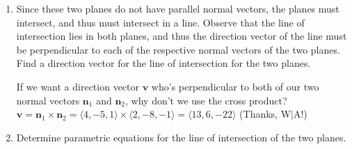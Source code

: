 \documentclass[10pt]{article}
\newcommand{\vv}{\mathbf{v}}
\newcommand{\vn}{\mathbf{n}}
\newenvironment{red}{\color{red}}{\ignorespacesafterend}
\begin{document}
\begin{enumerate}[leftmargin=0pt]
\begin{enumerate}
	\begin{red}
		Let's solve both scalar equations for $z$, and then equate the two $z$'s. 
		\begin{align*}
			\textrm{Plane 1: } 4x - 5y + z &= -2 \\
			z &= -2 -4x + 5y \\
			\textrm{Plane 2: } 2x - 8y - z &= -7 \\
			z &= 2x - 8y + 7 \\
			-2 - 4x + 5y &= 2x - 8y + 7 \\
			6x -13y &= -9
			\intertext{Now we get to pick some value we want for one of these variables. How about $x=0$?}
			-13y &= -9 \\
			y &= \dfrac{9}{13}
			\intertext{Cool, so now we have the $x$- and $y$-coordinates of a point that's on both planes. Substituting back into one of our $z$ equations:}
			z &= -2 -4x +5y \\
			&= -2 -4(0) + 5\left(\dfrac{9}{13}\right) = \dfrac{19}{13}
		\end{align*}
		Therefore, $\left(0, \dfrac{9}{13}, \dfrac{19}{13}\right)$ is a point that lies on both planes.

		(Other points that work include $\left(-\dfrac32, 0, 4\right)$, $\left(\dfrac{19}{22}, \dfrac{12}{11}, 0\right)$, and $(5,3,-7)$.)

	\end{red}
	\item Since these two planes do not have parallel normal vectors, the planes must intersect, and thus must intersect in a line. Observe that the line of intersection lies in both planes, and thus the direction vector of the line must be perpendicular to each of the respective normal vectors of the two planes. Find a direction vector for the line of intersection for the two planes.
	
	\begin{red}
		If we want a direction vector $\vv$ who's perpendicular to both of our two normal vectors $\vn_1$ and $\vn_2$, why don't we use the cross product? \\
		$\vv = \vn_1 \times \vn_2 = \langle 4, -5, 1\rangle \times \langle 2, -8, -1 \rangle = \langle 13, 6, -22 \rangle$ (Thanks, W$|$A!)
	\end{red}
	\item Determine parametric equations for the line of intersection of the two planes.
	

\end{enumerate}
\end{enumerate}
\end{document}
